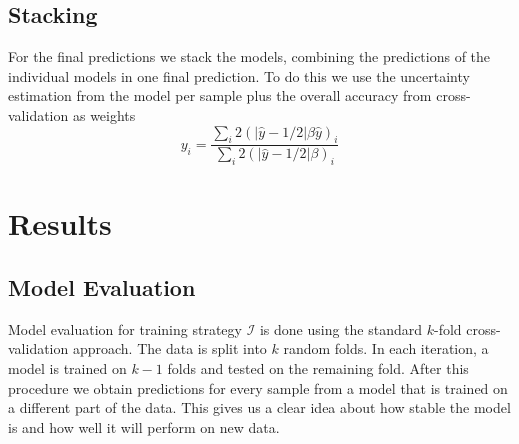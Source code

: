 \documentclass[a4paper,10pt]{article}
\begin{document}
\subsection{Stacking}
%
For the final predictions we stack the models, combining the predictions of the individual 
models in one final prediction. To do this we use the uncertainty estimation from the model per sample plus the overall accuracy from cross-validation
as weights
\begin{equation*}
 y_i =  \frac{\sum_i 2(\vert \hat{y} - 1/2\vert\beta \hat{y})_i}{\sum_i{2(\vert \hat{y} - 1/2\vert\beta)_i}} 
\end{equation*}
%
\section{Results}
% 
\subsection{Model Evaluation}
%
Model evaluation for training strategy $\mathcal{I}$ is done using the standard $k$-fold cross-validation approach. The data is split into $k$ random folds. In each iteration, a model is trained on $k-1$ folds and tested on the remaining fold. After this procedure we obtain predictions for every sample from a model that is trained on a different part of the data. This gives us a clear idea about how stable the model is and how well it will perform on new data.
%
\end{document}
